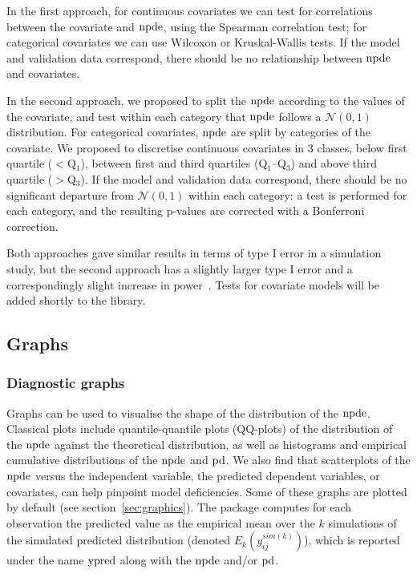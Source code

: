 In the first approach, for continuous covariates we can test for correlations between the covariate and ${\rm npde}$, using the Spearman correlation test; for categorical covariates we can use Wilcoxon or Kruskal-Wallis tests. If the model and validation data correspond, there should be no relationship between ${\rm npde}$ and covariates.

In the second approach, we proposed to split the ${\rm npde}$ according to the values of the covariate, and test within each category that ${\rm npde}$ follows a $\mathcal{N}(0,1)$ distribution. For categorical covariates, ${\rm npde}$ are split by categories of the covariate. We proposed to discretise continuous covariates in 3 classes, below first quartile ($<$Q$_1$), between first and third quartiles (Q$_1$--Q$_3$) and above third quartile ($>$Q$_3$). If the model and validation data correspond, there should be no significant departure from $\mathcal{N}(0,1)$ within each category: a test is performed for each category, and the resulting p-values are corrected with a Bonferroni correction.

Both approaches gave similar results in terms of type I error in a simulation study, but the second approach has a slightly larger type I error and a correspondingly slight increase in power~\cite{Brendel10}. Tests for covariate models will be added shortly to the library.

\subsection{Graphs} \label{sec:graphmethods}

\subsubsection{Diagnostic graphs} 

\hskip 18pt Graphs can be used to visualise the shape of the distribution of the ${\rm npde}$. Classical plots include quantile-quantile plots (QQ-plots) of the distribution of the ${\rm npde}$ against the theoretical distribution, as well as  histograms and empirical cumulative distributions of the ${\rm npde}$ and ${\rm pd}$. We also find that scatterplots of the ${\rm npde}$ versus the independent variable, the predicted dependent variables, or covariates, can help pinpoint model deficiencies. Some of these graphs are plotted by default (see section~\ref{sec:graphics}). The package computes for each observation the predicted value as the empirical mean over the $k$ simulations of the simulated predicted distribution (denoted $E_k(y^{sim(k)}_{ij})$), which is reported under the name ${\rm ypred}$ along with the ${\rm npde}$ and/or ${\rm pd}$.

